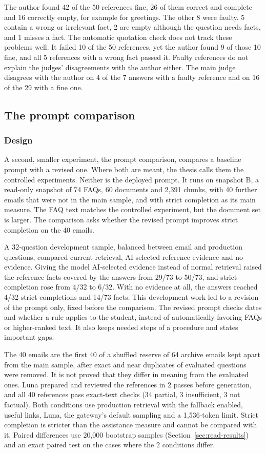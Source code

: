 The author found 42 of the 50 references fine, 26 of them correct and complete and 16 correctly empty, for example for greetings. The other 8 were faulty. 5 contain a wrong or irrelevant fact, 2 are empty although the question needs facts, and 1 misses a fact. The automatic quotation check does not track these problems well. It failed 10 of the 50 references, yet the author found 9 of those 10 fine, and all 5 references with a wrong fact passed it. Faulty references do not explain the judges' disagreements with the author either. The main judge disagrees with the author on 4 of the 7 answers with a faulty reference and on 16 of the 29 with a fine one.

\subsection{The prompt comparison}

\subsubsection{Design}
\label{sec:method-prompt}

A second, smaller experiment, the prompt comparison, compares a baseline prompt with a revised one. Where both are meant, the thesis calls them the controlled experiments. Neither is the deployed prompt. It runs on snapshot B, a read-only snapshot of 74 FAQs, 60 documents and 2,391 chunks, with 40 further emails that were not in the main sample, and with strict completion as its main measure. The FAQ text matches the controlled experiment, but the document set is larger. The comparison asks whether the revised prompt improves strict completion on the 40 emails.

A 32-question development sample, balanced between email and production questions, compared current retrieval, AI-selected reference evidence and no evidence. Giving the model AI-selected evidence instead of normal retrieval raised the reference facts covered by the answers from 29/73 to 50/73, and strict completion rose from 4/32 to 6/32. With no evidence at all, the answers reached 4/32 strict completions and 14/73 facts. This development work led to a revision of the prompt only, fixed before the comparison. The revised prompt checks dates and whether a rule applies to the student, instead of automatically favoring FAQs or higher-ranked text. It also keeps needed steps of a procedure and states important gaps.

The 40 emails are the first 40 of a shuffled reserve of 64 archive emails kept apart from the main sample, after exact and near duplicates of evaluated questions were removed. It is not proved that they differ in meaning from the evaluated ones. Luna prepared and reviewed the references in 2 passes before generation, and all 40 references pass exact-text checks (34 partial, 3 insufficient, 3 not factual). Both conditions use production retrieval with the fallback enabled, useful links, Luna, the gateway's default sampling and a 1,536-token limit. Strict completion is stricter than the assistance measure and cannot be compared with it. Paired differences use 20,000 bootstrap samples (Section~\ref{sec:read-results}) and an exact paired test on the cases where the 2 conditions differ.

